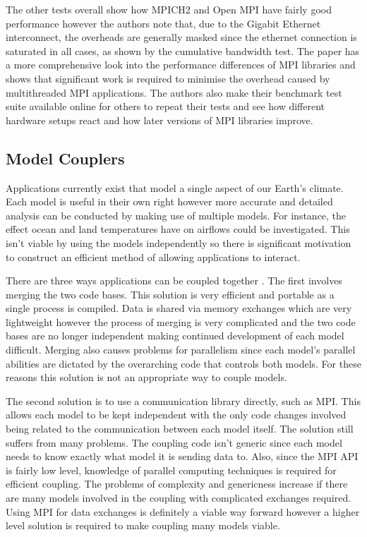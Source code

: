 \documentclass{acm_proc_article-sp}
\renewcommand{\_}{\underscore\hspace{0pt}}
\begin{document}
The other tests overall show how MPICH2 and Open MPI have fairly good
performance however the authors note that, due to the Gigabit Ethernet
interconnect, the overheads are generally masked since the ethernet connection
is saturated in all cases, as shown by the cumulative bandwidth test. The paper
has a more comprehensive look into the performance differences of MPI libraries
and shows that significant work is required to minimise the overhead caused by
multithreaded MPI applications. The authors also make their benchmark test suite
available online for others to repeat their tests and see how different hardware
setups react and how later versions of MPI libraries improve.

\subsection*{Model Couplers}

Applications currently exist that model a single aspect of our Earth's climate.
Each model is useful in their own right however more accurate and detailed
analysis can be conducted by making use of multiple models. For instance, the
effect ocean and land temperatures have on airflows could be investigated. This
isn't viable by using the models independently so there is significant
motivation to construct an efficient method of allowing applications to
interact.

There are three ways applications can be coupled together \cite{Thevenin}. The
first involves merging the two code bases. This solution is very efficient and
portable as a single process is compiled. Data is shared via memory exchanges
which are very lightweight however the process of merging is very complicated
and the two code bases are no longer independent making continued development of
each model difficult. Merging also causes problems for parallelism since each
model's parallel abilities are dictated by the overarching code that controls
both models. For these reasons this solution is not an appropriate way to couple
models.

The second solution \cite{Thevenin} is to use a communication library directly,
such as MPI. This allows each model to be kept independent with the only code
changes involved being related to the communication between each model itself.
The solution still suffers from many problems. The coupling code isn't generic
since each model needs to know exactly what model it is sending data to. Also,
since the MPI API is fairly low level, knowledge of parallel computing
techniques is required for efficient coupling. The problems of complexity and
genericness increase if there are many models involved in the coupling with
complicated exchanges required. Using MPI for data exchanges is definitely a
viable way forward however a higher level solution is required to make coupling
many models viable.
\end{document}
